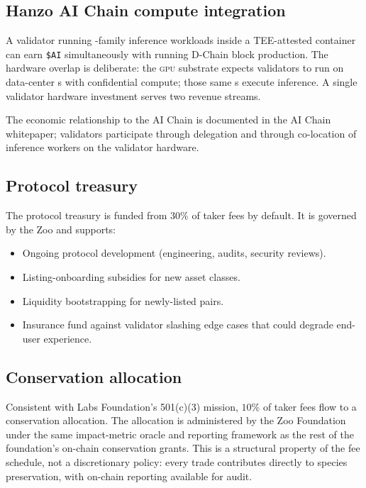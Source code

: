 \subsection{Hanzo AI Chain compute integration}

A validator running \Zen{}-family inference workloads inside a
TEE-attested container can earn \texttt{\$AI} simultaneously with
running \Zoo{} D-Chain block production. The hardware overlap is
deliberate: the \Quasar{}\textsc{gpu} substrate \cite{lp-132}
expects validators to run on data-center \GPU{}s with confidential
compute; those same \GPU{}s execute \Zen{} inference. A single
validator hardware investment serves two revenue streams.

The economic relationship to the \Hanzo{} AI Chain is documented
in the \Hanzo{} AI Chain whitepaper; \Zoo{} validators participate
through delegation and through co-location of inference workers
on the validator hardware.

\subsection{Protocol treasury}

The protocol treasury is funded from $30\%$ of taker fees by default.
It is governed by the Zoo \DAO{} and supports:

\begin{itemize}[leftmargin=1.2em]
  \item Ongoing protocol development (engineering, audits, security
        reviews).
  \item Listing-onboarding subsidies for new asset classes.
  \item Liquidity bootstrapping for newly-listed pairs.
  \item Insurance fund against validator slashing edge cases that
        could degrade end-user experience.
\end{itemize}

\subsection{Conservation allocation}

Consistent with \Zoo{} Labs Foundation's 501(c)(3) mission, $10\%$
of taker fees flow to a conservation allocation. The allocation is
administered by the Zoo Foundation under the same impact-metric
oracle and reporting framework as the rest of the foundation's
on-chain conservation grants. This is a structural property of the
fee schedule, not a discretionary policy: every trade contributes
directly to species preservation, with on-chain reporting available
for audit.

